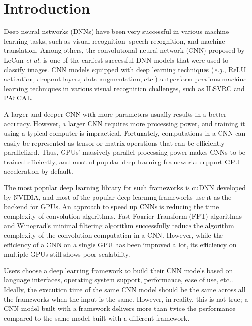 \section{Introduction}
Deep neural networks (DNNs) have been very successful in various machine learning tasks, such as visual recognition\cite{krizhevsky2012imagenet,vgg,RCNN}, speech recognition\cite{speech}, and machine translation\cite{machinetranslation}. Among others, the convolutional neural network (CNN) proposed by LeCun \textit{et al.}\cite{726791} is one of the earliest successful DNN models that were used to classify images. CNN models equipped with deep learning techniques (\textit{e.g.}, ReLU activation, dropout layers, data augmentation, etc.) outperform previous machine learning techniques in various visual recognition challenges, such as ILSVRC\cite{DBLP:journals/corr/RussakovskyDSKSMHKKBBF14} and PASCAL\cite{pascal}.

A larger and deeper CNN with more parameters usually results in a better accuracy. However, a larger CNN requires more processing power, and training it using a typical computer is impractical. Fortunately, computations in a CNN can easily be represented as tensor or matrix operations that can be efficiently parallelized. Thus, GPUs' massively parallel processing power makes CNNs to be trained efficiently, and most of popular deep learning frameworks support GPU acceleration by default\cite{DBLP:journals/corr/Al-RfouAAa16,jia2014caffe,tensorflow2015-whitepaper,torch,cntk}.

The most popular deep learning library for such frameworks is cuDNN\cite{cudnn} developed by NVIDIA, and most of the popular deep learning frameworks use it as the backend for GPUs. An approach to speed up CNNs is reducing the time complexity of convolution algorithms. Fast Fourier Transform (FFT) algorithms\cite{fftconv, fbfft} and Winograd's minimal filtering algorithm\cite{winograd} successfully reduce the algorithm complexity of the convolution computation in a CNN.
However, while the efficiency of a CNN on a single GPU has been improved a lot, its efficiency on multiple GPUs still shows poor scalability\cite{DBLP:journals/corr/YadanATR13}.

Users choose a deep learning framework to build their CNN models based on language interfaces, operating system support, performance, ease of use, etc.. Ideally, the execution time of the same CNN model should be the same across all the frameworks when the input is the same. However, in reality, this is not true; a CNN model built with a framework delivers more than twice the performance compared to the same model built with a different framework\cite{DBLP:journals/corr/BahrampourRSS15,DBLP:journals/corr/ShiWXC16}. 

